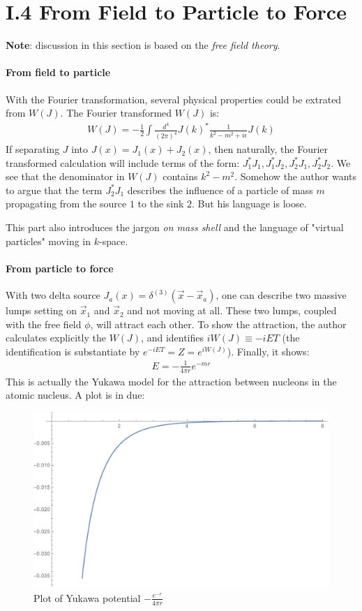 \documentclass{book}
\numberwithin{equation}{subsection} %
\theoremstyle{definition}
\begin{document}
\section{I.4 From Field to Particle to Force}
\label{sec:I.4 From Field to Particle to Force}

\textbf{Note}: discussion in this section is based on the \textit{free
field theory}.

\paragraph{From field to particle}

With the Fourier transformation, several physical properties
could be extrated from $W(J)$. The Fourier transformed $W(J)$ is:
\begin{align}
    W(J) = -\frac{1}{2}\int \frac{d^4}{(2\pi)^4}J(k)^*
        \frac{1}{k^2-m^2+i\epsilon}J(k)
\end{align}
If separating $J$ into $J(x)=J_1(x)+J_2(x)$, then naturally, the
Fourier transformed calculation will include terms of the form:
$J^*_1J_1,J^*_1J_2,J^*_2J_1,J^*_2J_2$. We see that the denominator
in $W(J)$ contains $k^2-m^2$. Somehow the author wants to argue that
the term $J^*_2J_1$ describes the influence of a particle of mass $m$
propagating from the source $1$ to the sink $2$. But his language is loose.

This part also introduces the jargon \textit{on mass shell} and the
language of "virtual particles" moving in $k$-space.

\paragraph{From particle to force}
With two delta source $J_a(x)=\delta^(3)(\vec{x}-\vec{x}_a)$, one can
describe two massive lumps setting on $\vec{x}_1$ and $\vec{x}_2$ and
not moving at all. These two lumps, coupled with the free field $\phi$,
will attract each other. To show the attraction, the author calculates
explicitly the $W(J)$, and identifies $iW(J) \equiv -iET$ (the
identification is substantiate by $e^{-iET} = Z = e^{iW(J)}$).
Finally, it shows:
\begin{align}
    E= -\frac{1}{4\pi r}e^{-mr}
\end{align}
This is actually the Yukawa model for the attraction between nucleons
in the atomic nucleus. A plot is in due:
\begin{figure}[H]
    \centering
    \includegraphics[width=0.8\linewidth]{pics/Yukawa-potential.pdf}
    \caption{Plot of Yukawa potential $-\frac{e^{-r}}{4 \pi  r}$}
\end{figure}
\end{document}
